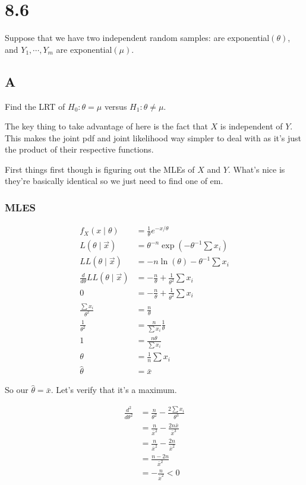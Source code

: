 \section*{8.6}

Suppose that we have two independent random samples: \rs are exponential$(\theta)$, and $Y_1, \cdots, Y_m$ are exponential$(\mu)$.

\subsection*{A}

Find the LRT of $H_0: \theta = \mu$ versus $H_1: \theta \neq \mu$.

The key thing to take advantage of here is the fact that $X$ is independent of $Y$. This makes the joint pdf and joint likelihood way simpler to deal with as it's just the product of their respective functions. 

First things first though is figuring out the MLEs of $X$ and $Y$. What's nice is they're basically identical so we just need to find one of em. 

\subsubsection*{MLES}

\begin{align*}
	f_X(x \mid \theta) &= \frac{1}{\theta} e^{-x/\theta} \\
	L(\theta \mid \vec{x}) &= \theta^{-n} \exp\left( -\theta^{-1} \sum x_i \right) \\
	LL(\theta \mid \vec{x}) &= -n\ln(\theta) - \theta^{-1} \sum x_i \\
	\frac{d}{d\theta} LL(\theta \mid \vec{x}) &= -\frac{n}{\theta} + \frac{1}{\theta^2} \sum x_i \\
	0 &= -\frac{n}{\theta} + \frac{1}{\theta^2} \sum x_i \\
	\frac{\sum x_i}{\theta^2} &= \frac{n}{\theta} \\
	\frac{1}{\theta^2} &= \frac{n}{\sum x_i} \frac{1}{\theta} \\
	1 &= \frac{n\theta}{\sum x_i} \\
	\theta &= \frac{1}{n} \sum x_i \\
	\hat{\theta} &= \bar{x}
\end{align*}

So our $\hat{\theta} = \bar{x}$. Let's verify that it's a maximum.

\begin{align*}
	\frac{d^2}{d\theta^2} &= \frac{n}{\theta^2} - \frac{2\sum x_i}{\theta^3} \\
	&= \frac{n}{\bar{x}^2} - \frac{2n\bar{x}}{\bar{x}^3} \\
	&= \frac{n}{\bar{x}^2} - \frac{2n}{\bar{x}^2} \\
	&= \frac{n - 2n}{\bar{x}^2} \\
	&= -\frac{n}{\bar{x}^2} < 0
\end{align*}

